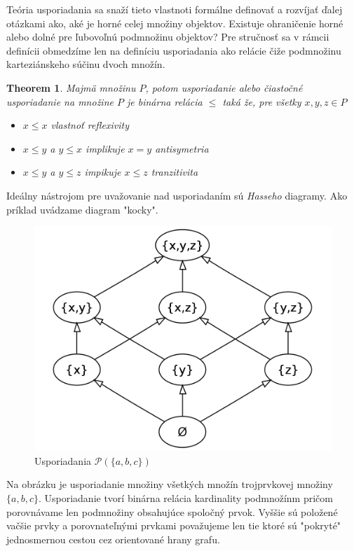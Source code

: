 \documentclass[a4paper,10pt,oneside]{report}%
\newtheorem{theorem}{Theorem}
\begin{document}
Teória usporiadania sa snaží tieto vlastnoti formálne definovať a rozvíjať ďalej
otázkami ako, aké je horné celej množiny objektov. Existuje ohraničenie horné alebo
dolné pre ľubovoľnú podmnožinu objektov?
    Pre stručnosť sa v rámcii definícii obmedzíme len na definíciu usporiadania
ako relácie čiže podmnožinu karteziánskeho súčinu dvoch množín.

\begin{theorem}
    Majmä množinu $P$, potom usporiadanie alebo čiastočné usporiadanie na množine
    $P$ je binárna relácia $\leq$ taká že, pre všetky $x,y,z \in P$
    \begin{itemize}
        \item $x \leq x$ vlastnoť reflexivity
        \item $x \leq y$ a $y \leq x$ implikuje $x = y$ antisymetria
        \item $x \leq y$ a $y \leq z$ impikuje $x \leq z$ tranzitivita
    \end{itemize}
\end{theorem}

    Ideálny nástrojom pre uvažovanie nad usporiadaním sú \emph{Hasseho} diagramy.
    Ako príklad uvádzame diagram "kocky".

\begin{figure}[!ht]
    \centering
    \includegraphics[scale=0.15]{cube.png}
    \caption{Usporiadania $\mathcal{P}(\{a,b,c\})$}
\end{figure}

    Na obrázku je usporiadanie množiny všetkých množín trojprvkovej množiny $\{ a,b,c \}$.
    Usporiadanie tvorí binárna relácia kardinality podmnožínm pričom porovnávame
len podmnožiny obsahujúce spoločný prvok.
    Vyššie sú položené vačšie prvky a porovnateľnými prvkami považujeme len tie
ktoré sú "pokryté" jednosmernou cestou cez orientované hrany grafu.
\end{document}
